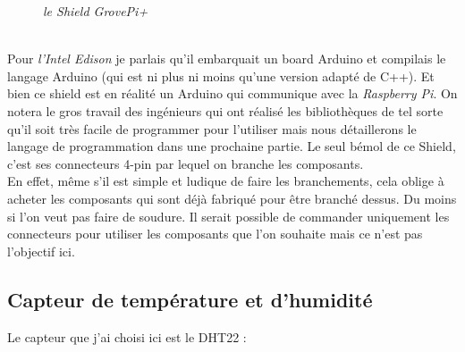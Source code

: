\begin{figure}[H]
\begin{center}
\end{center}
	\caption{ \textit{le Shield GrovePi+}}
\end{figure}\\

Pour \textit{l'Intel Edison} je parlais qu'il embarquait un board Arduino et compilais le langage Arduino (qui est ni plus ni moins qu'une version adapté de C++). Et bien ce shield est en réalité un Arduino qui communique avec la \textit{Raspberry Pi}. On notera le gros travail des ingénieurs qui ont réalisé les bibliothèques de tel sorte qu'il soit très facile de programmer pour l'utiliser mais nous détaillerons le langage de programmation dans une prochaine partie. Le seul bémol de ce Shield, c'est ses connecteurs 4-pin par lequel on branche les composants.\\

En effet, même s'il est simple et ludique de faire les branchements, cela oblige à acheter les composants qui sont déjà fabriqué pour être branché dessus. Du moins si l'on veut pas faire de soudure. Il serait possible de commander uniquement les connecteurs pour utiliser les composants que l'on souhaite mais ce n'est pas l'objectif ici.

\subsection{Capteur de température et d'humidité}

Le capteur que j'ai choisi ici est le DHT22 : %

